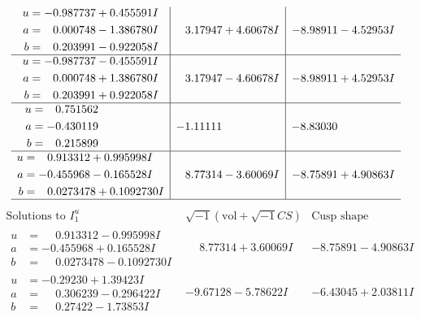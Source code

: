 \documentclass[1p]{elsarticle_modified}
\theoremstyle{definition}
\newcommand{\I}{\sqrt{-1}}
\begin{document}
$$\begin{array}{c|c|c}
\begin{aligned}
u &= -0.987737 + 0.455591 I \\
a &= \phantom{-}0.000748 - 1.386780 I \\
b &= \phantom{-}0.203991 - 0.922058 I\end{aligned}
 & \phantom{-}3.17947 + 4.60678 I & -8.98911 - 4.52953 I \\ \hline\begin{aligned}
u &= -0.987737 - 0.455591 I \\
a &= \phantom{-}0.000748 + 1.386780 I \\
b &= \phantom{-}0.203991 + 0.922058 I\end{aligned}
 & \phantom{-}3.17947 - 4.60678 I & -8.98911 + 4.52953 I \\ \hline\begin{aligned}
u &= \phantom{-}0.751562\phantom{ +0.000000I} \\
a &= -0.430119\phantom{ +0.000000I} \\
b &= \phantom{-}0.215899\phantom{ +0.000000I}\end{aligned}
 & -1.11111\phantom{ +0.000000I} & -8.83030\phantom{ +0.000000I} \\ \hline\begin{aligned}
u &= \phantom{-}0.913312 + 0.995998 I \\
a &= -0.455968 - 0.165528 I \\
b &= \phantom{-}0.0273478 + 0.1092730 I\end{aligned}
 & \phantom{-}8.77314 - 3.60069 I & -8.75891 + 4.90863 I\\
 \hline 
 \end{array}$$\newpage$$\begin{array}{c|c|c}  
\text{Solutions to }I^u_{1}& \I (\text{vol} + \sqrt{-1}CS) & \text{Cusp shape}\\
 \hline 
\begin{aligned}
u &= \phantom{-}0.913312 - 0.995998 I \\
a &= -0.455968 + 0.165528 I \\
b &= \phantom{-}0.0273478 - 0.1092730 I\end{aligned}
 & \phantom{-}8.77314 + 3.60069 I & -8.75891 - 4.90863 I \\ \hline\begin{aligned}
u &= -0.29230 + 1.39423 I \\
a &= \phantom{-}0.306239 - 0.296422 I \\
b &= \phantom{-}0.27422 - 1.73853 I\end{aligned}
 & -9.67128 - 5.78622 I & -6.43045 + 2.03811 I \\ \hline\begin{aligned}

\end{aligned}
\end{array}$$
\end{document}
